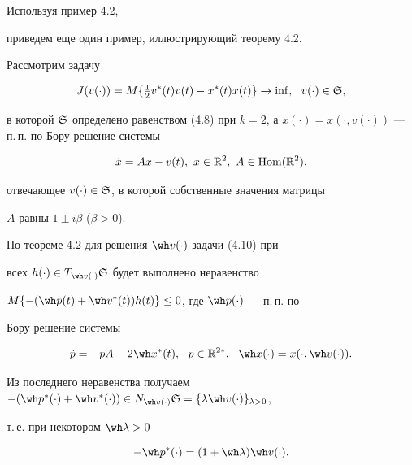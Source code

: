 Используя пример 4.2,


приведем еще один пример, иллюстрирующий теорему 4.2.





\begin{exams}


Рассмотрим задачу


\begin{equation}


J(v(\cdot))= M\{\tfrac{1}{2}v^{*}(t)v(t)-x^{*}(t)x(t)\}\to\inf,\ \


v(\cdot)\in\gS,


\end{equation}


в которой $\gS$ определено равенством (4.8) при $k=2$, а $x(\cdot)=


x(\cdot,v(\cdot))$ --- п.\,п. по Бору решение системы


\begin{equation}


\Dot x=Ax-v(t),\ x\in\R^{2},\ A\in\Hom(\R^{2}),


\end{equation}


отвечающее $v(\cdot)\in\frak S$, в которой собственные значения матрицы


$A$ равны $1\pm i\beta$ ($\beta>0$).


По теореме 4.2 для решения $\wh v(\cdot)$ задачи (4.10) при


всех $h(\cdot)\in T_{\wh v(\cdot)}\gS$ будет выполнено неравенство


$M\{-(\wh p(t)+\wh v{}^{*}(t))h(t)\}\le0$, где $\wh p(\cdot)$ --- п.\,п. по


Бору решение системы


\begin{equation}


\Dot p=-pA-2\wh x{}^{*}(t),\ \ p\in\R^{2*},\ \ \wh x(\cdot)=


x(\cdot,\wh v(\cdot)).


\end{equation}


Из последнего неравенства получаем $-(\wh p{}^{*}(\cdot)+\wh


v{}^{*}(\cdot))\in N_{\wh v(\cdot)}\gS=\{\lambda\wh v(\cdot)\}_{\lambda>0}$,


т.\,е. при некотором $\wh\lambda>0$


\begin{equation}


-\wh p{}^{*}(\cdot)=(1+\wh\lambda)\wh v(\cdot).



\end{equation}
\end{exams}
